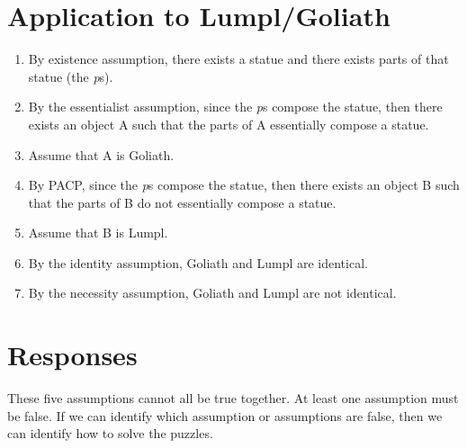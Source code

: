 \documentclass[9pt]{article}
\begin{document}
\section {Application to Lumpl/Goliath} 
\begin{enumerate}
\item By existence assumption, there exists a statue and there exists parts of that  statue (the \emph{p}s). 
\item By the essentialist assumption, since the \emph{p}s compose the statue, then there  exists an object A such that the parts of A essentially compose a statue. 
\item Assume that A is Goliath. 
\item By PACP, since the \emph{p}s compose the statue, then there exists an object B  such that the parts of B do not essentially compose a statue. 
\item Assume that B is Lumpl. 
\item By the identity assumption, Goliath and Lumpl are identical. 
\item By the necessity assumption, Goliath and Lumpl are not identical. 
\end{enumerate}


\section{Responses} 
These five assumptions cannot all be true together. At least one assumption must be  false. If we can identify which assumption or assumptions are false, then we can  identify how to solve the puzzles. 
\end{document}
